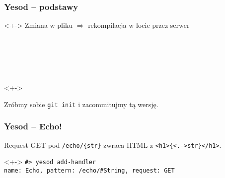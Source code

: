 \documentclass[landscape]{beamer}
\begin{document}
\begin{frame}
  \frametitle{Yesod -- podstawy}
  \begin{uncoverenv}<+->
    Zmiana w pliku $\Rightarrow$ rekompilacja w locie przez serwer
  \end{uncoverenv}

  \begin{center}
     \\
     \\
     \\
     \\
  \end{center}

  \begin{uncoverenv}<+->
    \begin{center}
      Zr\'obmy sobie \texttt{git init} i zacommitujmy t\k{a} wersj\k{e}.
    \end{center}
  \end{uncoverenv}
\end{frame}

\begin{frame}
  \frametitle{Yesod -- Echo!}

  Request GET pod \texttt{/echo/\{\alert<+->{str}\}} zwraca HTML z
  \texttt{<h1>\{\alert<.->{str}\}</h1>}.

  \begin{uncoverenv}<+->
    \texttt{\#> yesod add-handler} \\
    \texttt{name: Echo, pattern: /echo/\#String, request: GET}
  \end{uncoverenv}

  \vspace{1em}

   \\
\end{frame}
\end{document}
